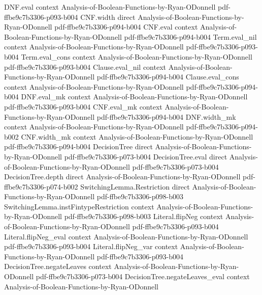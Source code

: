 \begin{theorem}
\proofstep
  {DNF.eval}
  {context}
  {Analysis-of-Boolean-Functions-by-Ryan-ODonnell}
  {pdf-ffbe9c7b3306-p093-b004}
\proofstep
  {CNF.width}
  {direct}
  {Analysis-of-Boolean-Functions-by-Ryan-ODonnell}
  {pdf-ffbe9c7b3306-p094-b004}
\proofstep
  {CNF.eval}
  {context}
  {Analysis-of-Boolean-Functions-by-Ryan-ODonnell}
  {pdf-ffbe9c7b3306-p094-b004}
\proofstep
  {Term.eval_nil}
  {context}
  {Analysis-of-Boolean-Functions-by-Ryan-ODonnell}
  {pdf-ffbe9c7b3306-p093-b004}
\proofstep
  {Term.eval_cons}
  {context}
  {Analysis-of-Boolean-Functions-by-Ryan-ODonnell}
  {pdf-ffbe9c7b3306-p093-b004}
\proofstep
  {Clause.eval_nil}
  {context}
  {Analysis-of-Boolean-Functions-by-Ryan-ODonnell}
  {pdf-ffbe9c7b3306-p094-b004}
\proofstep
  {Clause.eval_cons}
  {context}
  {Analysis-of-Boolean-Functions-by-Ryan-ODonnell}
  {pdf-ffbe9c7b3306-p094-b004}
\proofstep
  {DNF.eval_mk}
  {context}
  {Analysis-of-Boolean-Functions-by-Ryan-ODonnell}
  {pdf-ffbe9c7b3306-p093-b004}
\proofstep
  {CNF.eval_mk}
  {context}
  {Analysis-of-Boolean-Functions-by-Ryan-ODonnell}
  {pdf-ffbe9c7b3306-p094-b004}
\proofstep
  {DNF.width_mk}
  {context}
  {Analysis-of-Boolean-Functions-by-Ryan-ODonnell}
  {pdf-ffbe9c7b3306-p094-b002}
\proofstep
  {CNF.width_mk}
  {context}
  {Analysis-of-Boolean-Functions-by-Ryan-ODonnell}
  {pdf-ffbe9c7b3306-p094-b004}
\proofstep
  {DecisionTree}
  {direct}
  {Analysis-of-Boolean-Functions-by-Ryan-ODonnell}
  {pdf-ffbe9c7b3306-p073-b004}
\proofstep
  {DecisionTree.eval}
  {direct}
  {Analysis-of-Boolean-Functions-by-Ryan-ODonnell}
  {pdf-ffbe9c7b3306-p073-b004}
\proofstep
  {DecisionTree.depth}
  {direct}
  {Analysis-of-Boolean-Functions-by-Ryan-ODonnell}
  {pdf-ffbe9c7b3306-p074-b002}
\proofstep
  {SwitchingLemma.Restriction}
  {direct}
  {Analysis-of-Boolean-Functions-by-Ryan-ODonnell}
  {pdf-ffbe9c7b3306-p098-b003}
\proofstep
  {SwitchingLemma.instFintypeRestriction}
  {context}
  {Analysis-of-Boolean-Functions-by-Ryan-ODonnell}
  {pdf-ffbe9c7b3306-p098-b003}
\proofstep
  {Literal.flipNeg}
  {context}
  {Analysis-of-Boolean-Functions-by-Ryan-ODonnell}
  {pdf-ffbe9c7b3306-p093-b004}
\proofstep
  {Literal.flipNeg_eval}
  {context}
  {Analysis-of-Boolean-Functions-by-Ryan-ODonnell}
  {pdf-ffbe9c7b3306-p093-b004}
\proofstep
  {Literal.flipNeg_var}
  {context}
  {Analysis-of-Boolean-Functions-by-Ryan-ODonnell}
  {pdf-ffbe9c7b3306-p093-b004}
\proofstep
  {DecisionTree.negateLeaves}
  {context}
  {Analysis-of-Boolean-Functions-by-Ryan-ODonnell}
  {pdf-ffbe9c7b3306-p073-b004}
\proofstep
  {DecisionTree.negateLeaves_eval}
  {context}
  {Analysis-of-Boolean-Functions-by-Ryan-ODonnell}

\end{theorem}
